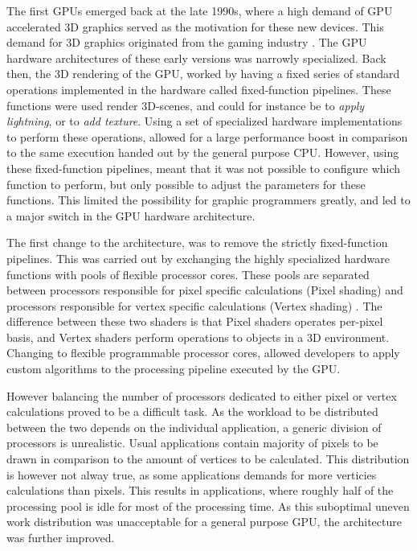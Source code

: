 The first GPUs  emerged back at the late 1990s, where a high demand of GPU accelerated 3D graphics served as the motivation for these new devices.
This demand for 3D graphics originated from the gaming industry \cite{Johansson2010}.
The GPU hardware architectures of these early versions was narrowly specialized.
Back then, the 3D rendering of the GPU, worked by having a fixed series of standard operations implemented in the hardware called fixed-function pipelines.
These functions were used render 3D-scenes, and could for instance be to \textit{apply lightning}, or to \textit{add texture}.
Using a set of specialized hardware implementations to perform these operations, allowed for a large performance boost in comparison to the same execution handed out by the general purpose CPU.
However, using these fixed-function pipelines, meant that it was not possible to configure which function to perform, but only possible to adjust the parameters for these functions.
This limited the possibility for graphic programmers greatly, and led to a major switch in the GPU hardware architecture.

The first change to the architecture, was to remove the strictly fixed-function pipelines.
This was carried out by exchanging the highly specialized hardware functions with pools of flexible processor cores.
These pools are separated between processors responsible for pixel specific calculations (Pixel shading) and processors responsible for vertex specific calculations (Vertex shading) \cite{Johansson2010}.
The difference between these two shaders is that Pixel shaders operates per-pixel basis, and Vertex shaders perform operations to objects in a 3D environment.
Changing to flexible programmable processor cores, allowed developers to apply custom algorithms to the processing pipeline executed by the GPU.


However balancing the number of processors dedicated to either pixel or vertex calculations proved to be a difficult task.
As the workload to be distributed between the two depends on the individual application, a generic division of processors is unrealistic.
Usual applications contain majority of pixels to be drawn in comparison to the amount of vertices to be calculated.
This distribution is however not alway true, as some applications demands for more verticies calculations than pixels.
This results in applications, where roughly half of the processing pool is idle for most of the processing time.
As this suboptimal uneven work distribution was unacceptable for a general purpose GPU, the architecture was further improved.

